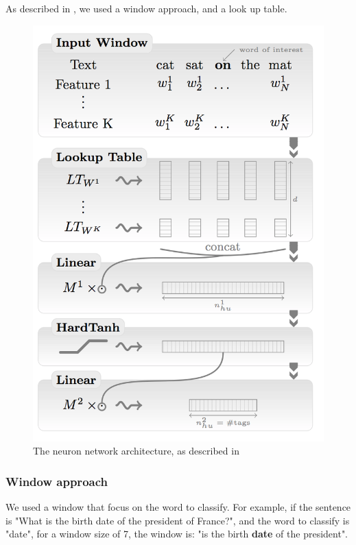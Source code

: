 As described in \cite{collobert}, we used a window approach, and a look up table.

\begin{figure}[!h]
  \centering
  \caption{The neuron network architecture, as described in \cite{collobert}}
  \label{tree_four}
    \includegraphics[scale=0.5]{../NLP-standalone-images/network.png}
\end{figure}

\subsubsection{Window approach}

We used a window that focus on the word to classify. For example, if the sentence is "What is the birth date of the president of France?", and the word to classify is "date", for a window size of 7, the window is: "is the birth \textbf{date} of the president".

